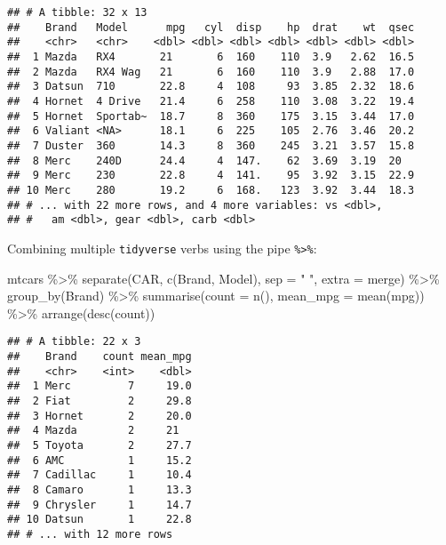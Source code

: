 \documentclass[
]{book}
\newenvironment{Shaded}{\begin{snugshade}}{\end{snugshade}}
\newcommand{\AttributeTok}[1]{\textcolor[rgb]{0.77,0.63,0.00}{#1}}
\newcommand{\FunctionTok}[1]{\textcolor[rgb]{0.00,0.00,0.00}{#1}}
\newcommand{\NormalTok}[1]{#1}
\newcommand{\SpecialCharTok}[1]{\textcolor[rgb]{0.00,0.00,0.00}{#1}}
\newcommand{\StringTok}[1]{\textcolor[rgb]{0.31,0.60,0.02}{#1}}
\begin{document}
\begin{verbatim}
## # A tibble: 32 x 13
##    Brand   Model      mpg   cyl  disp    hp  drat    wt  qsec
##    <chr>   <chr>    <dbl> <dbl> <dbl> <dbl> <dbl> <dbl> <dbl>
##  1 Mazda   RX4       21       6  160    110  3.9   2.62  16.5
##  2 Mazda   RX4 Wag   21       6  160    110  3.9   2.88  17.0
##  3 Datsun  710       22.8     4  108     93  3.85  2.32  18.6
##  4 Hornet  4 Drive   21.4     6  258    110  3.08  3.22  19.4
##  5 Hornet  Sportab~  18.7     8  360    175  3.15  3.44  17.0
##  6 Valiant <NA>      18.1     6  225    105  2.76  3.46  20.2
##  7 Duster  360       14.3     8  360    245  3.21  3.57  15.8
##  8 Merc    240D      24.4     4  147.    62  3.69  3.19  20  
##  9 Merc    230       22.8     4  141.    95  3.92  3.15  22.9
## 10 Merc    280       19.2     6  168.   123  3.92  3.44  18.3
## # ... with 22 more rows, and 4 more variables: vs <dbl>,
## #   am <dbl>, gear <dbl>, carb <dbl>
\end{verbatim}

Combining multiple \texttt{tidyverse} verbs using the pipe \texttt{\%\textgreater{}\%}:

\begin{Shaded}
\begin{Highlighting}[]
\NormalTok{mtcars }\SpecialCharTok{\%\textgreater{}\%} \FunctionTok{separate}\NormalTok{(CAR, }\FunctionTok{c}\NormalTok{(}\StringTok{\textquotesingle{}Brand\textquotesingle{}}\NormalTok{, }\StringTok{\textquotesingle{}Model\textquotesingle{}}\NormalTok{), }\AttributeTok{sep =} \StringTok{" "}\NormalTok{, }\AttributeTok{extra =} \StringTok{\textquotesingle{}merge\textquotesingle{}}\NormalTok{) }\SpecialCharTok{\%\textgreater{}\%}
  \FunctionTok{group\_by}\NormalTok{(Brand) }\SpecialCharTok{\%\textgreater{}\%} \FunctionTok{summarise}\NormalTok{(}\AttributeTok{count =} \FunctionTok{n}\NormalTok{(), }\AttributeTok{mean\_mpg =} \FunctionTok{mean}\NormalTok{(mpg)) }\SpecialCharTok{\%\textgreater{}\%}
  \FunctionTok{arrange}\NormalTok{(}\FunctionTok{desc}\NormalTok{(count))}
\end{Highlighting}
\end{Shaded}

\begin{verbatim}
## # A tibble: 22 x 3
##    Brand    count mean_mpg
##    <chr>    <int>    <dbl>
##  1 Merc         7     19.0
##  2 Fiat         2     29.8
##  3 Hornet       2     20.0
##  4 Mazda        2     21  
##  5 Toyota       2     27.7
##  6 AMC          1     15.2
##  7 Cadillac     1     10.4
##  8 Camaro       1     13.3
##  9 Chrysler     1     14.7
## 10 Datsun       1     22.8
## # ... with 12 more rows
\end{verbatim}
\end{document}
